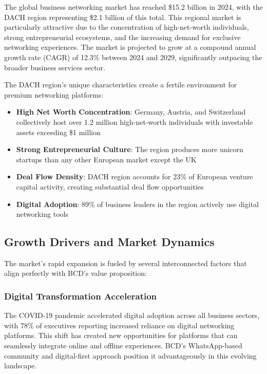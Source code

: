 The global business networking market has reached \$15.2 billion in 2024, with the DACH region representing \$2.1 billion of this total. This regional market is particularly attractive due to the concentration of high-net-worth individuals, strong entrepreneurial ecosystems, and the increasing demand for exclusive networking experiences. The market is projected to grow at a compound annual growth rate (CAGR) of 12.3\% between 2024 and 2029, significantly outpacing the broader business services sector.

The DACH region's unique characteristics create a fertile environment for premium networking platforms:
\begin{itemize}
    \item \textbf{High Net Worth Concentration}: Germany, Austria, and Switzerland collectively host over 1.2 million high-net-worth individuals with investable assets exceeding \$1 million
    \item \textbf{Strong Entrepreneurial Culture}: The region produces more unicorn startups than any other European market except the UK
    \item \textbf{Deal Flow Density}: DACH region accounts for 23\% of European venture capital activity, creating substantial deal flow opportunities
    \item \textbf{Digital Adoption}: 89\% of business leaders in the region actively use digital networking tools
\end{itemize}

\subsection{Growth Drivers and Market Dynamics}

The market's rapid expansion is fueled by several interconnected factors that align perfectly with BCD's value proposition:

\subsubsection{Digital Transformation Acceleration}
The COVID-19 pandemic accelerated digital adoption across all business sectors, with 78\% of executives reporting increased reliance on digital networking platforms. This shift has created new opportunities for platforms that can seamlessly integrate online and offline experiences. BCD's WhatsApp-based community and digital-first approach position it advantageously in this evolving landscape.

